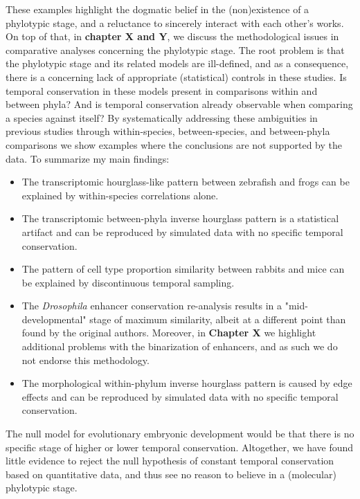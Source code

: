 These examples highlight the dogmatic belief in the (non)existence of a phylotypic stage, and a reluctance to sincerely interact with each other's works. On top of that, in \textbf{chapter X and Y}, we discuss the methodological issues in comparative analyses concerning the phylotypic stage. The root problem is that the phylotypic stage and its related models are ill-defined, and as a consequence, there is a concerning lack of appropriate (statistical) controls in these studies. Is temporal conservation in these models present in comparisons within and between phyla? And is temporal conservation already observable when comparing a species against itself? By systematically addressing these ambiguities in previous studies through within-species, between-species, and between-phyla comparisons we show examples where the conclusions are not supported by the data. To summarize my main findings:
\begin{itemize}
    \item The transcriptomic hourglass-like pattern between zebrafish and frogs\cite{marletaz2018} can be explained by within-species correlations alone.
    \item The transcriptomic between-phyla inverse hourglass pattern\cite{Levin2016} is a statistical artifact and can be reproduced by simulated data with no specific temporal conservation.
    \item The pattern of cell type proportion similarity between rabbits and mice\cite{Mayshar2023} can be explained by discontinuous temporal sampling.
    \item The \textit{Drosophila} enhancer conservation re-analysis results in a "mid-developmental" stage of maximum similarity, albeit at a different point than found by the original authors. Moreover, in \textbf{Chapter X} we highlight additional problems with the binarization of enhancers, and as such we do not endorse this methodology.
    \item  The morphological within-phylum inverse hourglass pattern is caused by edge effects and can be reproduced by simulated data with no specific temporal conservation.
\end{itemize}
\noindent
The null model for evolutionary embryonic development would be that there is no specific stage of higher or lower temporal conservation. Altogether, we have found little evidence to reject the null hypothesis of constant temporal conservation based on quantitative data, and thus see no reason to believe in a (molecular) phylotypic stage.

